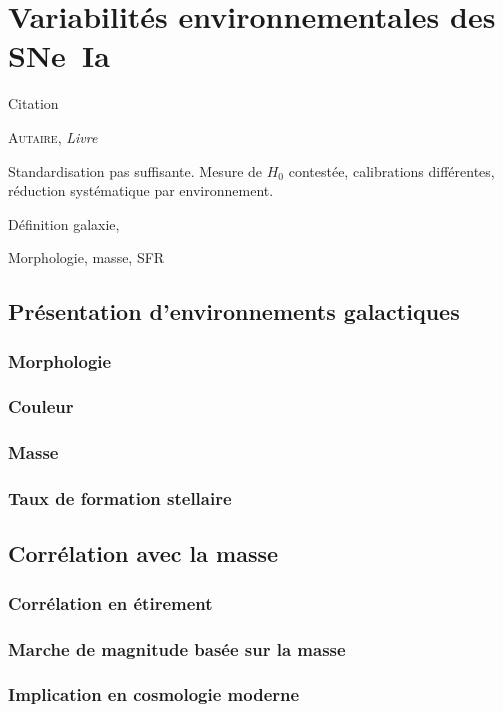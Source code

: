 \documentclass[../main/main.tex]{subfiles}
\begin{document}
\chapter{Variabilit\'es environnementales des SNe~Ia}\label{ch:env}
\epigraph{\openquote Citation\closequote}{\textsc{Autaire}, \textit{Livre}}

Standardisation pas suffisante. Mesure de $H_0$ contestée, calibrations
différentes, réduction systématique par environnement.

Définition galaxie,

Morphologie, masse, SFR

\vfill
\minitoc
\vfill
\newpage

\section{Présentation d'environnements galactiques}\label{sec:envpres}
\subsection{Morphologie}\label{ssec:morphost}
\subsection{Couleur}\label{ssec:chost}
\subsection{Masse}\label{ssec:mhost}
\subsection{Taux de formation stellaire}\label{ssc:sfrhost}

\section{Corrélation avec la masse}\label{ssec:mcorr}
\subsection{Corrélation en étirement}\label{sssec:mcorrx1}
\subsection{Marche de magnitude basée sur la masse}\label{sssec:mstep}
\subsection{Implication en cosmologie moderne}\label{sssec:mcosmo}
\end{document}
